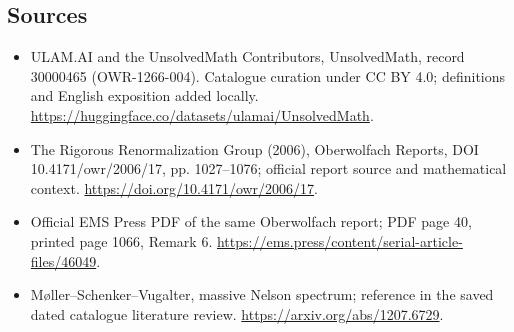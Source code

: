 \documentclass[11pt]{article}
\begin{document}
\subsection{Sources}
\begin{itemize}
\item[\hypertarget{source:30000465:1}{S1}] ULAM.AI and the UnsolvedMath Contributors, UnsolvedMath, record 30000465 (OWR-1266-004). Catalogue curation under CC BY 4.0; definitions and English exposition added locally.
\url{https://huggingface.co/datasets/ulamai/UnsolvedMath}.
\item[\hypertarget{source:30000465:2}{S2}] The Rigorous Renormalization Group (2006), Oberwolfach Reports, DOI 10.4171/owr/2006/17, pp. 1027--1076; official report source and mathematical context.
\url{https://doi.org/10.4171/owr/2006/17}.
\item[\hypertarget{source:30000465:3}{S3}] Official EMS Press PDF of the same Oberwolfach report; PDF page 40, printed page 1066, Remark 6.
\url{https://ems.press/content/serial-article-files/46049}.
\item[\hypertarget{source:30000465:4}{S4}] Møller--Schenker--Vugalter, massive Nelson spectrum; reference in the saved dated catalogue literature review.
\url{https://arxiv.org/abs/1207.6729}.
\end{itemize}
\label{end:30000465}
\end{document}
